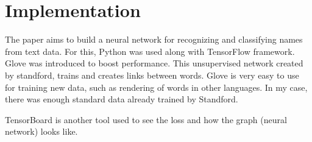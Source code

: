 \section{Implementation}

The paper aims to build a neural network for recognizing and classifying names from text data. For this, Python was used along with TensorFlow framework. Glove was introduced to boost performance. This unsupervised network created by standford, trains and creates links between words. Glove is very easy to use for training new data, such as rendering of words in other languages. In my case, there was enough standard data already trained by Standford. 

TensorBoard is another tool used to see the loss and how the graph (neural network) looks like.



